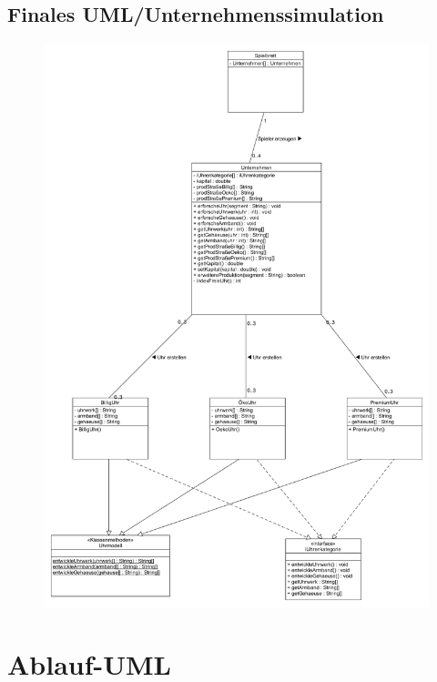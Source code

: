 \subsection{Finales UML/Unternehmenssimulation}
\begin{figure} [!h]
	\centering
	\includegraphics[scale=0.36]{img/Unternehmenssimmulation.png} 
\end{figure}
\clearpage
\section{Ablauf-UML}
